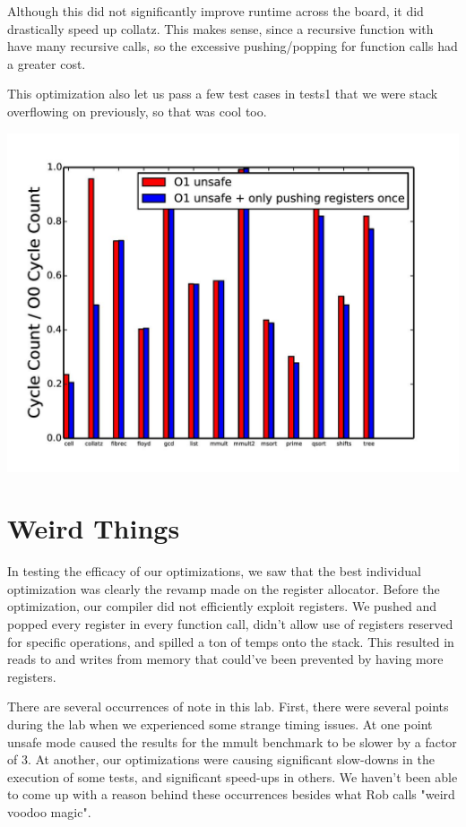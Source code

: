 \documentclass{article}
\begin{document}
Although this did not significantly improve runtime across the board, it did drastically speed up collatz. This makes sense, since a recursive function with have many recursive calls, so the excessive pushing/popping for function calls had a greater cost.

This optimization also let us pass a few test cases in tests1 that we were stack overflowing on previously, so that was cool too.

\includegraphics[scale=0.5]{O1_vs_onlyPushOnce-page-001}

\section{Weird Things}

In testing the efficacy of our optimizations, we saw that the best individual optimization was clearly the revamp made on the register allocator. Before the optimization, our compiler did not efficiently exploit registers. We pushed and popped every register in every function call, didn't allow use of registers reserved for specific operations, and spilled a ton of temps onto the stack. This resulted in reads to and writes from memory that could've been prevented by having more registers.

There are several occurrences of note in this lab. First, there were several points during the lab when we experienced some strange timing issues. At one point unsafe mode caused the results for the mmult benchmark to be slower by a factor of 3. At another, our optimizations were causing significant slow-downs in the execution of some tests, and significant speed-ups in others. We haven't been able to come up with a reason behind these occurrences besides what Rob calls "weird voodoo magic".
\end{document}
